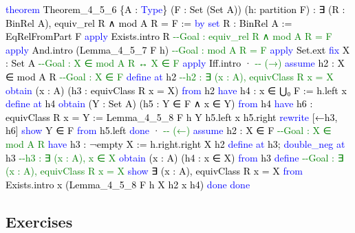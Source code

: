 \documentclass[
  letterpaper,
  DIV=11,
  numbers=noendperiod]{scrreprt}
\newenvironment{Shaded}{\begin{snugshade}}{\end{snugshade}}
\newcommand{\CommentTok}[1]{\textcolor[rgb]{0.37,0.37,0.37}{#1}}
\newcommand{\KeywordTok}[1]{\textcolor[rgb]{0.00,0.23,0.31}{#1}}
\newcommand{\NormalTok}[1]{\textcolor[rgb]{0.00,0.23,0.31}{#1}}
\renewcommand{\NormalTok}[1]{\textcolor[HTML]{000000}{#1}}
\renewcommand{\KeywordTok}[1]{\textcolor[HTML]{0000FF}{#1}}
\renewcommand{\CommentTok}[1]{\textcolor[HTML]{008000}{#1}}
\theoremstyle{remark}
\begin{document}
\begin{Shaded}
\begin{Highlighting}[]
\KeywordTok{theorem}\NormalTok{ Theorem\_4\_5\_6 \{A : }\KeywordTok{Type}\NormalTok{\} (F : Set (Set A)) (h: partition F) :}
\NormalTok{    ∃ (R : BinRel A), equiv\_rel R ∧ mod A R = F := }\KeywordTok{by}
  \KeywordTok{set}\NormalTok{ R : BinRel A := EqRelFromPart F}
  \KeywordTok{apply}\NormalTok{ Exists.intro R               }\CommentTok{{-}{-}Goal : equiv\_rel R ∧ mod A R = F}
  \KeywordTok{apply}\NormalTok{ And.intro (Lemma\_4\_5\_7 F h)  }\CommentTok{{-}{-}Goal : mod A R = F}
  \KeywordTok{apply}\NormalTok{ Set.ext}
  \KeywordTok{fix}\NormalTok{ X : Set A                      }\CommentTok{{-}{-}Goal :  X ∈ mod A R ↔ X ∈ F}
  \KeywordTok{apply}\NormalTok{ Iff.intro}
\NormalTok{  · }\CommentTok{{-}{-} (→)}
    \KeywordTok{assume}\NormalTok{ h2 : X ∈ mod A R          }\CommentTok{{-}{-}Goal : X ∈ F}
    \KeywordTok{define} \KeywordTok{at}\NormalTok{ h2                     }\CommentTok{{-}{-}h2 : ∃ (x : A), equivClass R x = X}
    \KeywordTok{obtain}\NormalTok{ (x : A) (h3 : equivClass R x = X) }\KeywordTok{from}\NormalTok{ h2}
    \KeywordTok{have}\NormalTok{ h4 : x ∈ ⋃₀ F := h.left x}
    \KeywordTok{define} \KeywordTok{at}\NormalTok{ h4}
    \KeywordTok{obtain}\NormalTok{ (Y : Set A) (h5 : Y ∈ F ∧ x ∈ Y) }\KeywordTok{from}\NormalTok{ h4}
    \KeywordTok{have}\NormalTok{ h6 : equivClass R x = Y :=}
\NormalTok{      Lemma\_4\_5\_8 F h Y h5.left x h5.right}
    \KeywordTok{rewrite}\NormalTok{ [←h3, h6]}
    \KeywordTok{show}\NormalTok{ Y ∈ F }\KeywordTok{from}\NormalTok{ h5.left}
    \KeywordTok{done}
\NormalTok{  · }\CommentTok{{-}{-} (←)}
    \KeywordTok{assume}\NormalTok{ h2 : X ∈ F                }\CommentTok{{-}{-}Goal : X ∈ mod A R}
    \KeywordTok{have}\NormalTok{ h3 : ¬empty X := h.right.right X h2}
    \KeywordTok{define} \KeywordTok{at}\NormalTok{ h3; }\KeywordTok{double\_neg} \KeywordTok{at}\NormalTok{ h3   }\CommentTok{{-}{-}h3 : ∃ (x : A), x ∈ X}
    \KeywordTok{obtain}\NormalTok{ (x : A) (h4 : x ∈ X) }\KeywordTok{from}\NormalTok{ h3}
    \KeywordTok{define}                       \CommentTok{{-}{-}Goal : ∃ (x : A), equivClass R x = X}
    \KeywordTok{show}\NormalTok{ ∃ (x : A), equivClass R x = X }\KeywordTok{from}
\NormalTok{      Exists.intro x (Lemma\_4\_5\_8 F h X h2 x h4)}
    \KeywordTok{done}
  \KeywordTok{done}
\end{Highlighting}
\end{Shaded}

\hypertarget{exercises-9}{%
\subsection{Exercises}\label{exercises-9}}
\end{document}
